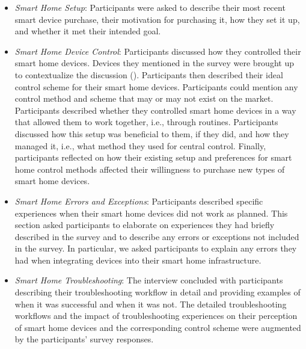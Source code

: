 \begin{itemize}
    \item \textit{Smart Home Setup}: Participants were asked to describe their most recent smart device purchase, their motivation for purchasing it, how they set it up, and whether it met their intended goal. 
    \item \textit{Smart Home Device Control}: Participants discussed how they controlled their smart home devices. Devices they mentioned in the survey were brought up to contextualize the discussion (). Participants then described their ideal control scheme for their smart home devices. Participants could mention any control method and scheme that may or may not exist on the market. Participants described whether they controlled smart home devices in a way that allowed them to work together, i.e., through routines. Participants discussed how this setup was beneficial to them, if they did, and how they managed it, i.e., what method they used for central control. Finally, participants reflected on how their existing setup and preferences for smart home control methods affected their willingness to purchase new types of smart home devices. 
    \item \textit{Smart Home Errors and Exceptions}: Participants described specific experiences when their smart home devices did not work as planned. This section asked participants to elaborate on experiences they had briefly described in the survey and to describe any errors or exceptions not included in the survey. In particular, we asked participants to explain any errors they had when integrating devices into their smart home infrastructure. 
    \item \textit{Smart Home Troubleshooting}: The interview concluded with participants describing their troubleshooting workflow in detail and providing examples of when it was successful and when it was not. The detailed troubleshooting workflows and the impact of troubleshooting experiences on their perception of smart home devices and the corresponding control scheme were augmented by the participants' survey responses.
\end{itemize}

